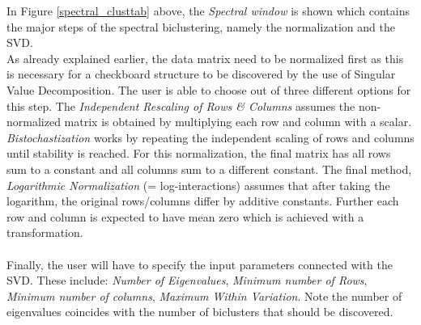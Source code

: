 \documentclass[a4paper]{article}\usepackage[]{graphicx}\usepackage[]{color}
\begin{document}
\noindent In Figure \ref{spectral_clusttab} above, the {\it Spectral window} is
shown which contains the major steps of the spectral biclustering, namely the
normalization and the SVD. \\
As already explained earlier, the data matrix need to be normalized first as
this is necessary for a checkboard structure to be discovered by the use of
Singular Value Decomposition. The user is able to choose out of three different
options for this step. The {\it Independent Rescaling of Rows \& Columns}
assumes the non-normalized matrix is obtained by multiplying each row and column
with a scalar. {\it Bistochastization} works by repeating the independent
scaling of rows and columns until stability is reached. For this normalization,
the final matrix has all rows sum to a constant and all columns sum to a
different constant. The final method, {\it Logarithmic Normalization} (=
log-interactions) assumes that after taking the logarithm, the original
rows/columns differ by additive constants. Further each row and column is
expected to have mean zero which is achieved with a transformation.
\\ \\
Finally, the user will have to specify the input parameters connected with the
SVD. These include: {\it Number of Eigenvalues}, {\it Minimum number of Rows},
{\it Minimum number of columns}, {\it Maximum Within Variation}. Note the number
of eigenvalues coincides with the number of biclusters that should be
discovered.
\end{document}
